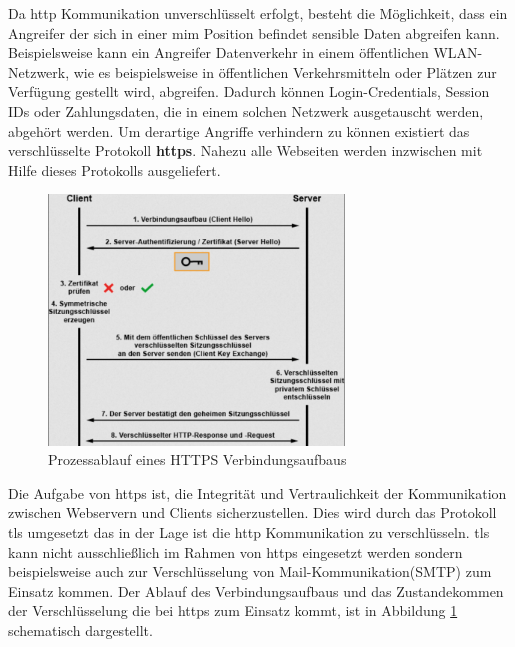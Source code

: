 




Da \ac{http} Kommunikation unverschlüsselt erfolgt, besteht die Möglichkeit, dass ein Angreifer der sich in einer \ac{mim} Position befindet sensible Daten abgreifen kann.
Beispielsweise kann ein Angreifer Datenverkehr in einem öffentlichen WLAN-Netzwerk, wie es beispielsweise in öffentlichen Verkehrsmitteln oder Plätzen zur Verfügung gestellt wird, abgreifen.
Dadurch können Login-Credentials, Session IDs oder Zahlungsdaten, die in einem solchen Netzwerk ausgetauscht werden, abgehört werden.
Um derartige Angriffe verhindern zu können existiert das verschlüsselte Protokoll \textbf{\ac{https}}.
Nahezu alle Webseiten werden inzwischen mit Hilfe dieses Protokolls ausgeliefert.

\begin{figure}[!hbt]
    \centering
    \includegraphics[width=0.7\textwidth]{./images/HTTPS-Processflow.png}
    \caption{Prozessablauf eines HTTPS Verbindungsaufbaus}
    \label{fig:https-porcess-flow}
\end{figure}

Die Aufgabe von \ac{https} ist, die Integrität und Vertraulichkeit der Kommunikation zwischen Webservern und Clients sicherzustellen.
Dies wird durch das Protokoll \ac{tls} umgesetzt das in der Lage ist die \ac{http} Kommunikation zu verschlüsseln.
\ac{tls} kann nicht ausschließlich im Rahmen von \ac{https} eingesetzt werden sondern beispielsweise auch zur Verschlüsselung von Mail-Kommunikation(SMTP) zum Einsatz kommen.
Der Ablauf des Verbindungsaufbaus und das Zustandekommen der Verschlüsselung die bei \ac{https} zum Einsatz kommt, ist in Abbildung \ref{fig:https-porcess-flow} schematisch dargestellt.

